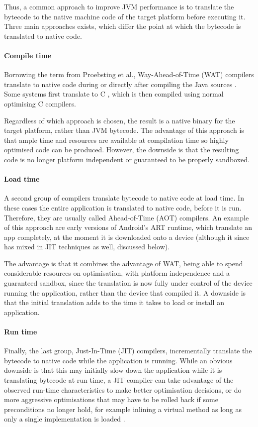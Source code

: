 Thus, a common approach to improve JVM performance is to translate the bytecode to the native machine code of the target platform before executing it. Three main approaches exists, which differ the point at which the bytecode is translated to native code.

\paragraph{Compile time}
Borrowing the term from Proebsting et al., Way-Ahead-of-Time (WAT) compilers translate to native code during or directly after compiling the Java sources \cite{Proebsting:1997wg}. Some systems first translate to C \cite{Dean:1996wb}, which is then compiled using normal optimising C compilers. 

Regardless of which approach is chosen, the result is a native binary for the target platform, rather than JVM bytecode. The advantage of this approach is that ample time and resources are available at compilation time so highly optimised code can be produced. However, the downside is that the resulting code is no longer platform independent or guaranteed to be properly sandboxed.

\paragraph{Load time}
A second group of compilers translate bytecode to native code at load time. In these cases the entire application is translated to native code, before it is run. Therefore, they are usually called Ahead-of-Time (AOT) compilers. An example of this approach are early versions of Android's ART runtime, which translate an app completely, at the moment it is downloaded onto a device (although it since has mixed in JIT techniques as well, discussed below).

The advantage is that it combines the advantage of WAT, being able to spend considerable resources on optimisation, with platform independence and a guaranteed sandbox, since the translation is now fully under control of the device running the application, rather than the device that compiled it. A downside is that the initial translation adds to the time it takes to load or install an application.

\paragraph{Run time}
Finally, the last group, Just-In-Time (JIT) compilers, incrementally translate the bytecode to native code while the application is running. While an obvious downside is that this may initially slow down the application while it is translating bytecode at run time, a JIT compiler can take advantage of the observed run-time characteristics to make better optimisation decisions, or do more aggressive optimisations that may have to be rolled back if some preconditions no longer hold, for example inlining a virtual method as long as only a single implementation is loaded \cite{Ishizaki:2000vv}.







